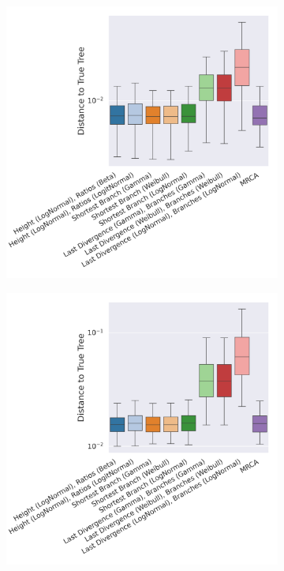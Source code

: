 \documentclass[10pt,letterpaper]{article}
\begin{document}
\begin{figure}
	\caption{The log squared branch distance to the true tree for point estimates using the different distributions and datasets. (The lower the better.)}
	
	\centering
	\begin{subfigure}[b]{0.4\textwidth}
		\centering
		\includegraphics[width=\textwidth]{figures/yule-100-ccd1-point-estimates.png}
	\end{subfigure}
	\begin{subfigure}[b]{0.4\textwidth}
		\centering
		\includegraphics[width=\textwidth]{figures/yule-200-ccd1-point-estimates.png}
	\end{subfigure}
	

\end{figure}
\end{document}
